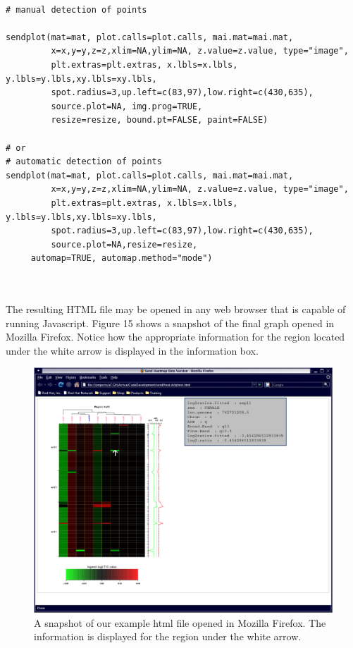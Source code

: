 \documentclass[]{article}
\begin{document}
\begin{verbatim}

# manual detection of points

sendplot(mat=mat, plot.calls=plot.calls, mai.mat=mai.mat,
         x=x,y=y,z=z,xlim=NA,ylim=NA, z.value=z.value, type="image",
         plt.extras=plt.extras, x.lbls=x.lbls, y.lbls=y.lbls,xy.lbls=xy.lbls, 
         spot.radius=3,up.left=c(83,97),low.right=c(430,635),
         source.plot=NA, img.prog=TRUE,
         resize=resize, bound.pt=FALSE, paint=FALSE)

# or 
# automatic detection of points
sendplot(mat=mat, plot.calls=plot.calls, mai.mat=mai.mat,
         x=x,y=y,z=z,xlim=NA,ylim=NA, z.value=z.value, type="image",
         plt.extras=plt.extras, x.lbls=x.lbls, y.lbls=y.lbls,xy.lbls=xy.lbls, 
         spot.radius=3,up.left=c(83,97),low.right=c(430,635),
         source.plot=NA,resize=resize,
	 automap=TRUE, automap.method="mode")



\end{verbatim}


The resulting HTML file may be opened in any web browser that is capable of running Javascript. Figure 15 shows a snapshot of the final graph opened in Mozilla Firefox. Notice how the appropriate information for the region located under the white arrow is displayed in the information box.

\begin{center}
\begin{figure}
\includegraphics{sendPlot4}
\caption{A snapshot of our example html file opened in Mozilla Firefox. The information is displayed for the region under the white arrow.}
\end{figure}
\end{center}
\end{document}
